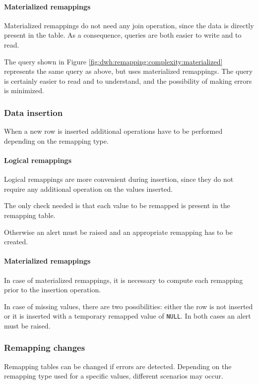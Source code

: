     \paragraph{Materialized remappings}
        Materialized remappings do not need any join operation, since the data is directly present in the table.
        As a consequence, queries are both easier to write and to read.
    
        The query shown in Figure \ref{fig:dwh:remapping:complexity:materialized} represents the same query as above, but uses materialized remappings.
        The query is certainly easier to read and to understand, and the possibility of making errors is minimized.

\subsubsection{Data insertion}
    When a new row is inserted additional operations have to be performed depending on the remapping type.
    
    \paragraph{Logical remappings}
        Logical remappings are more convenient during insertion, since they do not require any additional operation on the values inserted.
        
        The only check needed is that each value to be remapped is present in the remapping table.
        
        Otherwise an alert must be raised and an appropriate remapping has to be created.
    
    \paragraph{Materialized remappings}
        In case of materialized remappings, it is necessary to compute each remapping prior to the insertion operation.
        
        In case of missing values, there are two possibilities: either the row is not inserted or it is inserted with a temporary remapped value of \texttt{NULL}.
        In both cases an alert must be raised.

\subsubsection{Remapping changes}
    Remapping tables can be changed if errors are detected.
    Depending on the remapping type used for a specific values, different scenarios may occur.

